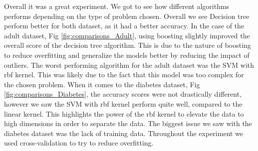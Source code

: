 \documentclass[11pt, twocolumn]{article}
\begin{document}
    Overall it was a great experiment. We got to see how different algorithms performs depending on the type of problem chosen. Overall we see Decision tree perform better for both dataset, as it had a better accuracy. In the case of the adult dataset, Fig \ref{fig:comparisons_Adult}, using boosting slightly improved the overall score of the decision tree algorithm. This is due to the nature of boosting to reduce overfitting and generalize the models better by reducing the impact of outliers. The worst performing algorithm for the adult dataset was the SVM with rbf kernel. This was likely due to the fact that this model was too complex for the chosen problem. When it comes to the diabetes dataset, Fig \ref{fig:comparisons_Diabetes}, the accuracy scores were not drastically different, however we saw the SVM with rbf kernel perform quite well, compared to the linear kernel. This highlights the power of the rbf kernel to elevate the data to high dimensions in order to separate the data. The biggest issue we saw with the diabetes dataset was the lack of training data. Throughout the experiment we used cross-validation to try to reduce overfitting.
\end{document}
